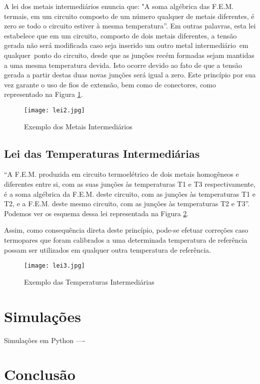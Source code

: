 \documentclass[a4paper,12pt]{report}
\begin{document}
	A lei dos metais intermediários enuncia que: "A soma algébrica das F.E.M. termais, em um circuito composto de um número qualquer de metais diferentes, é zero se todo o circuito estiver à mesma temperatura”. Em outras palavras, esta lei estabelece que em um circuito, composto de dois metais diferentes, a tensão gerada não será modificada caso seja inserido um outro metal intermediário em qualquer ponto do circuito, desde que as junções recém formadas sejam mantidas a uma mesma temperatura devida. Isto ocorre devido ao fato de que a tensão gerada a partir destas duas novas junções será igual a zero. Este princípio por sua vez garante o uso de fios de extensão, bem como de conectores, como  representado na Figura \ref{lei2}.

	\singlespacing
	
	\begin{figure}[htbp]
		\centering
		\texttt{[image: lei2.jpg]}
		\caption{Exemplo dos Metais Intermediários}
		\label{lei2}
	\end{figure}
	

	\subsection{Lei das Temperaturas Intermediárias}

	“A F.E.M. produzida em circuito termoelétrico de dois metais homogêneos e diferentes entre si, com as suas junções às temperaturas T1 e T3 respectivamente, é a soma algébrica da F.E.M. deste circuito, com as junções às temperaturas T1 e T2, e a F.E.M. deste mesmo circuito, com as junções às temperaturas T2 e T3”. Podemos ver os esquema dessa lei representada na Figura \ref{lei3}.
	 
	\singlespacing

	Assim, como consequência direta deste princípio, pode-se efetuar correções caso termopares que foram calibrados a uma determinada temperatura de referência possam ser utilizados em qualquer outra temperatura de referência.

	\begin{figure}[htbp]
		\centering
		\texttt{[image: lei3.jpg]}
		\caption{Exemplo das Temperaturas Intermediárias}
		\label{lei3}
	\end{figure}

	\section{Simulações}
	
	Simulações em Python ----
	

	\section{Conclusão}
	
	\nocite{*}
	

	
	
	
\end{document}
